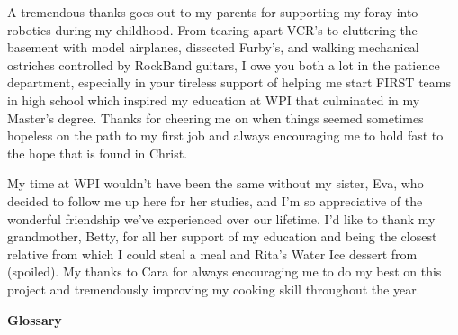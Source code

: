 \documentclass[12pt]{report}
\begin{document}
A tremendous thanks goes out to my parents for supporting my foray into robotics during my childhood. From tearing apart VCR's to cluttering the basement with model airplanes, dissected Furby's, and walking mechanical ostriches controlled by RockBand guitars, I owe you both a lot in the patience department, especially in your tireless support of helping me start FIRST teams in high school which inspired my education at WPI that culminated in my Master's degree. Thanks for cheering me on when things seemed sometimes hopeless on the path to my first job and always encouraging me to hold fast to the hope that is found in Christ.

My time at WPI wouldn't have been the same without my sister, Eva, who decided to follow me up here for her studies, and I'm so appreciative of the wonderful friendship we've experienced over our lifetime. I'd like to thank my grandmother, Betty, for all her support of my education and being the closest relative from which I could steal a meal and Rita's Water Ice dessert from (spoiled). My thanks to Cara for always encouraging me to do my best on this project and tremendously improving my cooking skill throughout the year.

\clearpage

\tableofcontents

\listoffigures

\listoftables

\clearpage

\begin{center}
	\textbf{Glossary}
\end{center}
\end{document}
